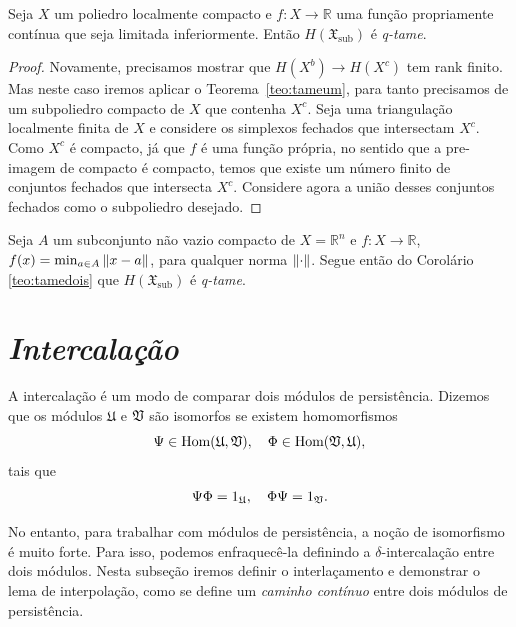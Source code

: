 \begin{cor}\label{teo:tamedois}
Seja $X$ um poliedro localmente compacto e $f \colon X \to \mathbb{R}$ uma função propriamente contínua
que seja limitada inferiormente. Então $H(\mathfrak{X}_{\text{sub}})$ é \textit{q-tame}.
\end{cor}
\begin{proof}
Novamente, precisamos mostrar que $H(X^b) \to H(X^c)$ tem rank finito. Mas neste caso iremos aplicar
o Teorema~\ref{teo:tameum}, para tanto precisamos de um subpoliedro compacto de $X$ que contenha $X^c$. 
Seja uma triangulação localmente finita de $X$ e considere os simplexos fechados que intersectam $X^c$. 
Como $X^c$ é compacto, já que $f$ é uma função própria, no sentido que a pre-imagem de compacto é compacto,
temos que existe um número finito de conjuntos fechados que intersecta $X^c$. Considere agora a união
desses conjuntos fechados como o subpoliedro desejado. 
\end{proof}

\begin{cor}\label{teo:tametres} 
Seja $A$ um subconjunto não vazio compacto de $X = \mathbb{R}^n$ e $f \colon X \to \mathbb{R}$, $f(x) =
\min_{a\in A} \left\lVert x-a\right\rVert$, para qualquer norma $\left\lVert\cdot\right\rVert$. Segue então do Corolário \ref{teo:tamedois}
que $H(\mathfrak{X}_{\text{sub}})$ é \textit{q-tame}.
\end{cor}

\section{\textit{Intercalação}} 

A intercalação é um modo de comparar dois módulos de persistência. Dizemos que os módulos
$\mathfrak{U}$ e $\mathfrak{V}$ são isomorfos se existem homomorfismos
\begin{equation*}
    \Psi \in \text{Hom}(\mathfrak{U}, \mathfrak{V}), \quad \Phi \in \text{Hom}(\mathfrak{V}, \mathfrak{U}), 
\end{equation*}
tais que 
\begin{equation*}
    \Psi \Phi = 1_{\mathfrak{U}}, \quad \Phi \Psi = 1_{\mathfrak{V}}.
\end{equation*}

No entanto, para trabalhar com módulos de persistência, a noção de isomorfismo é muito forte. 
Para isso, podemos enfraquecê-la definindo a $\delta$-intercalação entre dois módulos. 
Nesta subseção iremos definir o interlaçamento e demonstrar o lema de interpolação,
como se define um \textit{caminho contínuo} entre dois módulos de persistência. 

